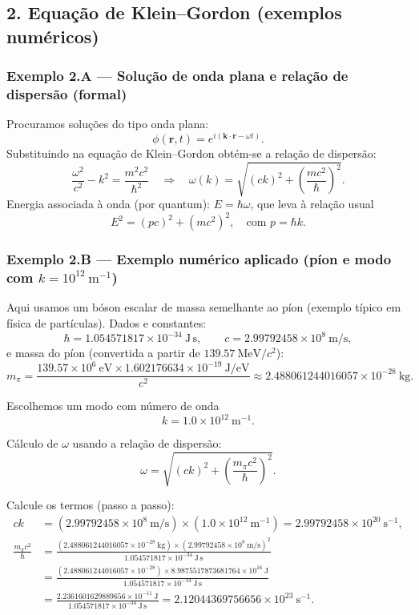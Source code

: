 \documentclass[12pt,a4paper]{article}
\begin{document}
\subsection*{2. Equação de Klein--Gordon (exemplos numéricos)}

\subsubsection*{Exemplo 2.A — Solução de onda plana e relação de dispersão (formal)}

Procuramos soluções do tipo onda plana:
\[
\phi(\mathbf{r},t) = e^{i(\mathbf{k}\cdot\mathbf{r}-\omega t)}.
\]
Substituindo na equação de Klein--Gordon obtém-se a relação de dispersão:
\[
\frac{\omega^2}{c^2} - k^2 = \frac{m^2 c^2}{\hbar^2}
\quad\Longrightarrow\quad
\omega(k) = \sqrt{(ck)^2 + \left(\frac{mc^2}{\hbar}\right)^{\!2}}.
\]
Energia associada à onda (por quantum): \(E=\hbar\omega\), que leva à relação usual
\[
E^2 = (pc)^2 + (mc^2)^2,
\quad\text{com } p=\hbar k.
\]

\subsubsection*{Exemplo 2.B — Exemplo numérico aplicado (píon e modo com \(k=10^{12}\ \mathrm{m^{-1}}\))}

Aqui usamos um bóson escalar de massa semelhante ao píon (exemplo típico em física de partículas).  
Dados e constantes:
\[
\hbar = 1.054571817\times 10^{-34}\ \mathrm{J\,s},\qquad
c = 2.99792458\times 10^{8}\ \mathrm{m/s},
\]
e massa do píon (convertida a partir de \(139.57\ \mathrm{MeV}/c^2\)):
\[
m_\pi = \frac{139.57\times 10^6\ \mathrm{eV}\times 1.602176634\times 10^{-19}\ \mathrm{J/eV}}{c^2}
\approx 2.488061244016057\times 10^{-28}\ \mathrm{kg}.
\]

Escolhemos um modo com número de onda
\[
k = 1.0\times 10^{12}\ \mathrm{m^{-1}}.
\]

Cálculo de \(\omega\) usando a relação de dispersão:
\[
\omega = \sqrt{(ck)^2 + \left(\frac{m_\pi c^2}{\hbar}\right)^{\!2}}.
\]

Calcule os termos (passo a passo):
\begin{align*}
ck &= (2.99792458\times 10^{8}\ \mathrm{m/s})\times(1.0\times 10^{12}\ \mathrm{m^{-1}})
= 2.99792458\times 10^{20}\ \mathrm{s^{-1}}, \\[6pt]
\frac{m_\pi c^2}{\hbar}
&= \frac{(2.488061244016057\times 10^{-28}\ \mathrm{kg})\times (2.99792458\times 10^{8}\ \mathrm{m/s})^2}{1.054571817\times 10^{-34}\ \mathrm{J\,s}} \\
&= \frac{(2.488061244016057\times 10^{-28})\times 8.9875517873681764\times 10^{16}\ \mathrm{J}}{1.054571817\times 10^{-34}\ \mathrm{J\,s}} \\
&= \frac{2.2361601629889656\times 10^{-11}\ \mathrm{J}}{1.054571817\times 10^{-34}\ \mathrm{J\,s}}
= 2.12044369756656\times 10^{23}\ \mathrm{s^{-1}}.
\end{align*}
\end{document}
